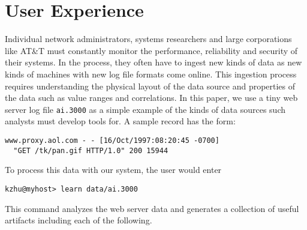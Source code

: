 \documentclass[preprint]{sig-alternate-sigmod08}
\begin{document}
\section{User Experience}

Individual network administrators, systems researchers and large 
corporations like AT\&T must constantly monitor the performance,
reliability and security of their systems.
In the process, they often have to ingest new kinds of data
as new kinds of machines with new log file formats come
online.  This ingestion process requires understanding the physical
layout of the data source and properties of the data such as value
ranges and correlations.  In this paper, we use a tiny
web server log file {\tt ai.3000} as a simple example of the kinds of
data sources such analysts must develop tools for. A sample record has
the form:

{\small
\begin{verbatim}
www.proxy.aol.com - - [16/Oct/1997:08:20:45 -0700] 
  "GET /tk/pan.gif HTTP/1.0" 200 15944
\end{verbatim}
}

\noindent
To process this data with our system, the user would enter


{\small
\begin{verbatim}
kzhu@myhost> learn data/ai.3000 
\end{verbatim}
}

\noindent
This command analyzes the web server data and generates a collection
of useful artifacts including each of the following.
\end{document}

